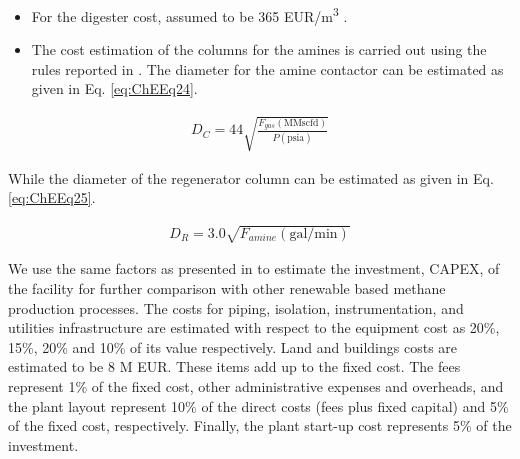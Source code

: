 \begin{refsection}[referencesCh7]
\begin{itemize}
	\item For the digester cost, assumed to be 365 EUR/m\textsuperscript{3} \citep{taifouris2018multiscale}.
	\item The cost estimation of the columns for the amines is carried out using the rules reported in \citet{2012gpsa}. The diameter for the amine contactor can be estimated as given in Eq. \ref{eq:ChEEq24}.
\end{itemize}

\begin{align}
{D_C} = 44\sqrt {\frac{{{F_{gas}}(\text{MMscfd})}}{{P(\text{psia})}}} \label{eq:ChEEq24}
\end{align}

While the diameter of the regenerator column can be estimated as given in Eq. \ref{eq:ChEEq25}.

\begin{align}
{D_R} = 3.0\sqrt {{F_{amine}}(\text{gal/min} )} \label{eq:ChEEq25}
\end{align}

We use the same factors as presented in \citet{davis2014optimala} to estimate the investment, CAPEX, of the facility for further comparison with other renewable based methane production processes. The costs for piping, isolation, instrumentation, and utilities infrastructure are estimated with respect to the equipment cost as 20\%, 15\%, 20\% and 10\% of its value respectively. Land and buildings costs are estimated to be 8 M EUR. These items add up to the fixed cost. The fees represent 1\% of the fixed cost, other administrative expenses and overheads, and the plant layout represent 10\% of the direct costs (fees plus fixed capital) and 5\% of the fixed cost, respectively. Finally, the plant start-up cost represents 5\% of the investment.


\end{refsection}

